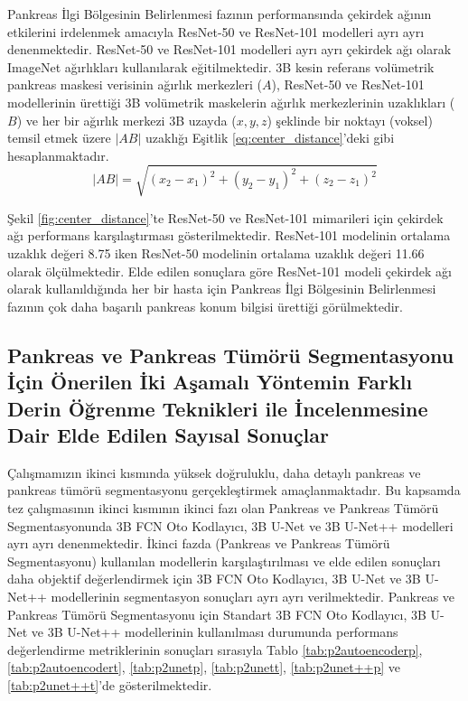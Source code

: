 Pankreas İlgi Bölgesinin Belirlenmesi fazının performansında çekirdek ağının etkilerini irdelenmek amacıyla ResNet-50 ve ResNet-101 modelleri ayrı ayrı denenmektedir. ResNet-50 ve ResNet-101 modelleri ayrı ayrı çekirdek ağı olarak ImageNet ağırlıkları kullanılarak eğitilmektedir. 3B kesin referans volümetrik pankreas maskesi verisinin ağırlık merkezleri ($A$), ResNet-50 ve ResNet-101 modellerinin ürettiği 3B volümetrik maskelerin ağırlık merkezlerinin uzaklıkları ($B$) ve her bir ağırlık merkezi 3B uzayda ($x,y,z$) şeklinde bir noktayı (voksel) temsil etmek üzere $|AB|$ uzaklığı Eşitlik \ref{eq:center_distance}'deki gibi hesaplanmaktadır.
\begin{equation}
	\label{eq:center_distance}
	|AB|=\sqrt{\left(x_{2}-x_{1}\right)^{2}+\left(y_{2}-y_{1}\right)^{2}+\left(z_{2}-z_{1}\right)^{2}}
\end{equation}

Şekil \ref{fig:center_distance}’te ResNet-50 ve ResNet-101 mimarileri için çekirdek ağı performans karşılaştırması gösterilmektedir. ResNet-101 modelinin ortalama uzaklık değeri 8.75 iken ResNet-50 modelinin ortalama uzaklık değeri 11.66 olarak ölçülmektedir. Elde edilen sonuçlara göre ResNet-101 modeli çekirdek ağı olarak kullanıldığında her bir hasta için Pankreas İlgi Bölgesinin Belirlenmesi fazının çok daha başarılı pankreas konum bilgisi ürettiği görülmektedir.

\subsection{Pankreas ve Pankreas Tümörü Segmentasyonu İçin Önerilen İki Aşamalı Yöntemin Farklı Derin Öğrenme Teknikleri ile İncelenmesine Dair Elde Edilen Sayısal Sonuçlar}

Çalışmamızın ikinci kısmında yüksek doğruluklu, daha detaylı pankreas ve pankreas tümörü segmentasyonu gerçekleştirmek amaçlanmaktadır. Bu kapsamda tez çalışmasının ikinci kısmının ikinci fazı olan Pankreas ve Pankreas Tümörü Segmentasyonunda 3B FCN Oto Kodlayıcı, 3B U-Net ve 3B U-Net++ modelleri ayrı ayrı denenmektedir. İkinci fazda (Pankreas ve Pankreas Tümörü Segmentasyonu) kullanılan modellerin karşılaştırılması ve elde edilen sonuçları daha objektif değerlendirmek için 3B FCN Oto Kodlayıcı, 3B U-Net ve 3B U-Net++ modellerinin segmentasyon sonuçları ayrı ayrı verilmektedir. Pankreas ve Pankreas Tümörü Segmentasyonu için Standart 3B FCN Oto Kodlayıcı, 3B U-Net ve 3B U-Net++ modellerinin kullanılması durumunda performans değerlendirme metriklerinin sonuçları sırasıyla Tablo \ref{tab:p2autoencoderp}, \ref{tab:p2autoencodert}, \ref{tab:p2unetp}, \ref{tab:p2unett}, \ref{tab:p2unet++p} ve \ref{tab:p2unet++t}'de gösterilmektedir.

